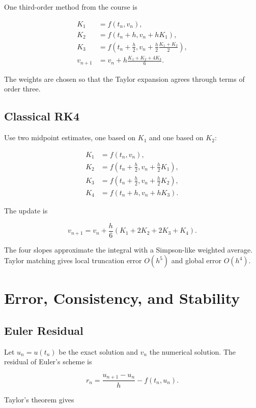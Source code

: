 \documentclass[12pt, a4paper]{article}
\theoremstyle{break}
\begin{document}
One third-order method from the course is

\[
\begin{aligned}
K_1&=f(t_n,v_n),\\
K_2&=f(t_n+h,v_n+hK_1),\\
K_3&=f\left(t_n+\frac h2,v_n+\frac h2\frac{K_1+K_2}{2}\right),\\
v_{n+1}&=v_n+h\frac{K_1+K_2+4K_3}{6}.
\end{aligned}
\]

The weights are chosen so that the Taylor expansion agrees through terms of order three.

\subsection{Classical RK4}\label{classical-rk4}

Use two midpoint estimates, one based on \(K_1\) and one based on \(K_2\):

\[
\begin{aligned}
K_1&=f(t_n,v_n),\\
K_2&=f\left(t_n+\frac h2,v_n+\frac h2K_1\right),\\
K_3&=f\left(t_n+\frac h2,v_n+\frac h2K_2\right),\\
K_4&=f(t_n+h,v_n+hK_3).
\end{aligned}
\]

The update is

\[
\boxed{v_{n+1}=v_n+\frac h6(K_1+2K_2+2K_3+K_4)}.
\]

The four slopes approximate the integral with a Simpson-like weighted average. Taylor matching gives local truncation error \(O(h^5)\) and global error \(O(h^4)\).

\section{Error, Consistency, and Stability}\label{error-consistency-and-stability}

\subsection{ Euler Residual}\label{euler-residual}

Let \(u_n=u(t_n)\) be the exact solution and \(v_n\) the numerical solution. The residual of Euler's scheme is

\[
r_n=\frac{u_{n+1}-u_n}{h}-f(t_n,u_n).
\]

Taylor's theorem gives
\end{document}
